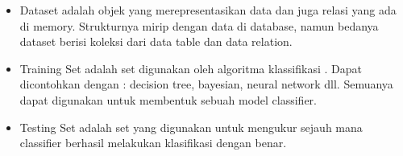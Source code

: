\begin{enumerate}
\begin{itemize}
\item Dataset adalah objek yang merepresentasikan data dan juga relasi yang ada di memory. Strukturnya mirip dengan data di database, namun bedanya dataset berisi koleksi dari data table dan data relation.
\par
\item Training Set adalah set digunakan oleh algoritma klassifikasi . Dapat dicontohkan dengan :  decision tree, bayesian, neural network dll. Semuanya dapat digunakan untuk membentuk sebuah model classifier.
\par
\item Testing Set adalah set yang digunakan untuk mengukur sejauh mana classifier berhasil melakukan klasifikasi dengan benar.
\par
\end{itemize}
\end{enumerate}


